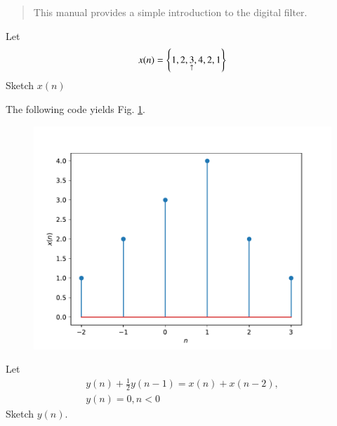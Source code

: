 \documentclass[journal,12pt,twocolumn]{IEEEtran}
\begin{document}
%
\IEEEpeerreviewmaketitle

\bigskip

\begin{abstract}
This manual provides a simple introduction to the digital filter.
\end{abstract}

\begin{problem}
\label{prob1.1}
Let
\begin{equation}
x(n) = \left\{1,2,\underset{\uparrow}{3},4,2,1\right\}
\end{equation}
Sketch $x(n)$
\end{problem}
\solution The following code yields Fig. \ref{fig_3a}.

\begin{figure}[!h]
\begin{center}
\includegraphics[width=\columnwidth]{./figs/xn}
\end{center}
\label{fig_3a}	
\end{figure}
%
\begin{problem}
Let
\begin{multline}
y(n) + \frac{1}{2}y(n-1) = x(n) + x(n-2), 
\\
 y(n) = 0, n < 0
\end{multline}
Sketch $y(n)$.
\end{problem}
\end{document}
